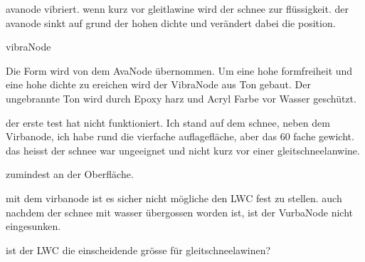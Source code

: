 avanode vibriert. wenn kurz vor gleitlawine wird der schnee zur flüssigkeit. der avanode sinkt auf grund der hohen dichte und verändert dabei die position.

vibraNode


Die Form wird von dem AvaNode übernommen. Um eine hohe formfreiheit und eine hohe dichte zu ereichen wird der VibraNode aus Ton gebaut. Der ungebrannte Ton wird durch Epoxy harz und Acryl Farbe vor Wasser geschützt.

der erste test hat nicht funktioniert. Ich stand auf dem schnee, neben dem Virbanode, ich habe rund die vierfache auflagefläche, aber das 60 fache gewicht. das heisst der schnee war ungeeignet und nicht kurz vor einer gleitschneelanwine.

zumindest an der Oberfläche.


mit dem virbanode ist es sicher nicht mögliche den LWC fest zu stellen. auch nachdem der schnee mit wasser übergossen worden ist, ist der VurbaNode nicht eingesunken.

ist der LWC die einscheidende grösse für gleitschneelawinen?

